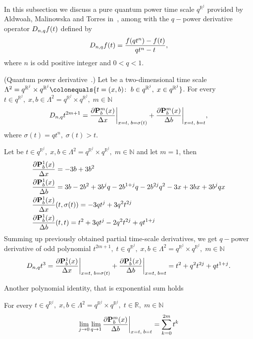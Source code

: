 In this subsection we discuss a pure quantum power time scale $q^{\mathbb{R}^j}$ provided by Aldwoah, Malinowska
and Torres in~\cite{aldwoah2011power}, among with the $q-$power derivative operator $D_{n,q} f(t)$ defined by
\[
    D_{n,q} f(t) = \frac{f(qt^n) - f(t)}{qt^n - t},
\]
where $n$ is odd positive integer and $0 < q < 1$.
\begin{cor}
(Quantum power derivative~\cite{aldwoah2011power}.)
    Let be a two-dimensional time scale
    $\Lambda^2 = q^{\mathbb{R}^j} \times q^{\mathbb{R}^j}
    \colonequals \{t=(x,b) \colon \; b \in q^{\mathbb{R}^j}, \; x \in q^{\mathbb{R}^j} \}$.
    For every $t\in q^{\mathbb{R}^j}, \; x,b\in\Lambda^2 = q^{\mathbb{R}^j} \times q^{\mathbb{R}^j}, \; m\in\mathbb{N}$
    \[
        D_{n,q} t^{2m+1}
        = \frac{\partial {\mathbf{P}}\sp{m} \sb{b}(x)}{\Delta x} \bigg |_{x = t, \; b = \sigma(t)}
        + \frac{\partial {\mathbf{P}}\sp{m} \sb{b}(x)}{\Delta b} \bigg |_{x = t, \; b = t},
    \]
    where $\sigma(t) = qt^n, \; \sigma(t) > t$.
\end{cor}
\begin{examp}
    \label{time_scale_pure_quantum_power_example_1}
    Let be $t\in q^{\mathbb{R}^j}, \; x,b\in\Lambda^2 = q^{\mathbb{R}^j} \times q^{\mathbb{R}^j}, \; m\in\mathbb{N}$
    and let $m=1$, then
    \begin{align*}
        &\frac{\partial {\mathbf{P}}\sp{1} \sb{b}(x)}{\Delta x} = -3 b + 3 b^2 \\
        &\frac{\partial {\mathbf{P}}\sp{1} \sb{b}(x)}{\Delta b} = 3 b - 2 b^2 + 3 b^j q - 2 b^{1 + j} q - 2 b^{2 j} q^2 - 3 x + 3 b x + 3 b^j q x \\
        &\frac{\partial {\mathbf{P}}\sp{1} \sb{b}(x)}{\Delta x}(t, \sigma(t)) = -3 q t^j + 3 q^2 t^{2 j} \\
        &\frac{\partial {\mathbf{P}}\sp{1} \sb{b}(x)}{\Delta b}(t, t) = t^2 + 3 q t^j - 2 q^2 t^{2 j} + q t^{1 + j}
    \end{align*}
    Summing up previously obtained partial time-scale derivatives, we get $q-$power derivative of odd polynomial
    $t^{2m+1}, \; t\in q^{\mathbb{R}^j}, \; x,b\in\Lambda^2 = q^{\mathbb{R}^j} \times q^{\mathbb{R}^j}, \; m\in\mathbb{N}$
    \[
        D_{n,q} t^{3}
        = \frac{\partial {\mathbf{P}}\sp{1} \sb{b}(x)}{\Delta x} \bigg |_{x = t, \; b = \sigma(t)}
        + \frac{\partial {\mathbf{P}}\sp{1} \sb{b}(x)}{\Delta b} \bigg |_{x = t, \; b = t}
        = t^2 + q^2 t^{2 j} + q t^{1 + j}.
    \]
\end{examp}

Another polynomial identity, that is exponential sum holds
\begin{cor}
    \label{time_scale_pure_quantum_power_corollary_1}
    For every $t\in q^{\mathbb{R}^j}, \; x,b\in\Lambda^2 = q^{\mathbb{R}^j} \times q^{\mathbb{R}^j}, \; t\in\mathbb{R}, \; m\in\mathbb{N}$
    \[
        \lim \limits_{j \to 0} \lim \limits_{q \to 1} \frac{\partial {\mathbf{P}}\sp{m} \sb{b}(x)}{\Delta b} \bigg |_{x = t, \; b = t}
        = \sum_{k=0}^{2m} t^k
    \]
\end{cor}

